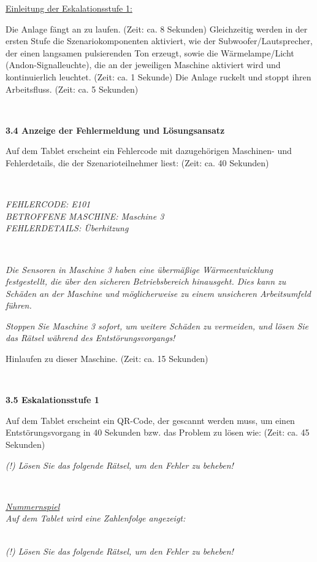 \underline{Einleitung der Eskalationsstufe 1:}

Die Anlage fängt an zu laufen. (Zeit: ca. 8 Sekunden) 
Gleichzeitig werden in der ersten Stufe die Szenariokomponenten aktiviert, wie der Subwoofer/Lautsprecher, der einen langsamen pulsierenden Ton erzeugt, sowie die Wärmelampe/Licht (Andon-Signalleuchte), die an der jeweiligen Maschine aktiviert wird und kontinuierlich leuchtet. (Zeit: ca. 1 Sekunde)
Die Anlage ruckelt und stoppt ihren Arbeitsfluss. (Zeit: ca. 5 Sekunden)

\

\textbf{3.4 Anzeige der Fehlermeldung und Lösungsansatz}

Auf dem Tablet erscheint ein Fehlercode mit dazugehörigen Maschinen- und Fehlerdetails, die der Szenarioteilnehmer liest: (Zeit: ca. 40 Sekunden)

\

\emph{FEHLERCODE: E101\\
BETROFFENE MASCHINE: Maschine 3\\
FEHLERDETAILS: Überhitzung}

\

\emph{Die Sensoren in Maschine 3 haben eine übermäßige Wärmeentwicklung festgestellt, die über den sicheren Betriebsbereich hinausgeht. Dies kann zu Schäden an der Maschine und möglicherweise zu einem unsicheren Arbeitsumfeld führen.}

\emph{Stoppen Sie Maschine 3 sofort, um weitere Schäden zu vermeiden, und lösen Sie das Rätsel während des Entstörungsvorgangs!}

Hinlaufen zu dieser Maschine. (Zeit: ca. 15 Sekunden)

\

\textbf{3.5 Eskalationsstufe 1}

Auf dem Tablet erscheint ein QR-Code, der gescannt werden muss, um einen Entstörungsvorgang in 40 Sekunden bzw. das Problem zu lösen wie: (Zeit: ca. 45 Sekunden)

\emph{(!) Lösen Sie das folgende Rätsel, um den Fehler zu beheben!}

\

\underline{\emph{Nummernspiel}} \\
\emph{Auf dem Tablet wird eine Zahlenfolge angezeigt:} \\

\

\emph{(!) Lösen Sie das folgende Rätsel, um den Fehler zu beheben!} \\

